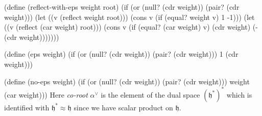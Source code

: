 \documentclass[a4paper,10pt]{article}
\theoremstyle{definition} \newtheorem{Def}{Definition}
\begin{document}
(define (reflect-with-eps weight root)
  (if (or (null? (cdr weight))
          (pair? (cdr weight)))
      (let ((v (reflect weight root)))
        (cons v (if (equal? weight v) 1 -1)))
      (let ((v (reflect (car weight) root)))
        (cons v (if (equal? (car weight) v) (cdr weight) (- (cdr weight)))))))

(define (eps weight)
  (if (or (null? (cdr weight))
          (pair? (cdr weight)))
      1
      (cdr weight)))

(define (no-eps weight)
  (if (or (null? (cdr weight))
          (pair? (cdr weight)))
      weight
      (car weight)))
\nwendcode{}\nwdocspar
Here {\it co-root} $\alpha^{\vee}$ is the element of the dual space $(\mathfrak{h}^*)^*$ which is identified with $\mathfrak{h}^*\approx \mathfrak{h}$ since we have scalar product on $\mathfrak{h}$.
\end{document}
